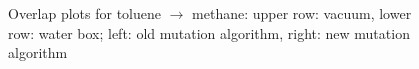\begin{figure}[h]
	\hfil
	
	\caption{Overlap plots for toluene $\mathrm{\rightarrow}$ methane: upper row: vacuum, lower row: water box; left: old mutation algorithm, right: new mutation algorithm}
	\label{fig:toluene_overlaps}
\end{figure}


